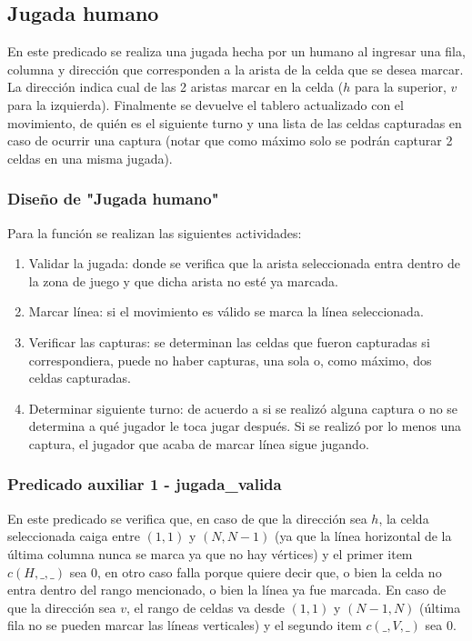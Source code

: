 \documentclass[12pt]{article} %
\begin{document}
		\subsection{Jugada humano}
		En este predicado se realiza una jugada hecha por un humano al ingresar una fila, columna y dirección que corresponden a la arista de la celda que se desea marcar. La dirección indica cual de las 2 aristas marcar en la celda ($h$ para la superior, $v$ para la izquierda). Finalmente se devuelve el tablero actualizado con el movimiento, de quién es el siguiente turno y una lista de las celdas capturadas en caso de ocurrir una captura (notar que como máximo solo se podrán capturar 2 celdas en una misma jugada).
		
			\subsubsection{Diseño de "Jugada humano"}
			Para la función se realizan las siguientes actividades:
			\begin{enumerate}
				\item Validar la jugada: donde se verifica que la arista seleccionada entra dentro de la zona de juego y que dicha arista no esté ya marcada.
				\item Marcar línea: si el movimiento es válido se marca la línea seleccionada.
				\item Verificar las capturas: se determinan las celdas que fueron capturadas si correspondiera, puede no haber capturas, una sola o, como máximo, dos celdas capturadas.
				\item Determinar siguiente turno: de acuerdo a si se realizó alguna captura o no se determina a qué jugador le toca jugar después. Si se realizó por lo menos una captura, el jugador que acaba de marcar línea sigue jugando.
			\end{enumerate}
			
			\subsubsection{Predicado auxiliar 1 - jugada\_valida}
			En este predicado se verifica que, en caso de que la dirección sea $h$, la celda seleccionada caiga entre $(1,1)$ y $(N, N-1)$ (ya que la línea horizontal de la última columna nunca se marca ya que no hay vértices) y el primer item $c(H,\_,\_)$ sea 0, en otro caso falla porque quiere decir que, o bien la celda no entra dentro del rango mencionado, o bien la línea ya fue marcada. En caso de que la dirección sea $v$, el rango de celdas va desde $(1,1)$ y $(N-1,N)$ (última fila no se pueden marcar las líneas verticales) y el segundo item $c(\_,V,\_)$ sea 0.
			
\end{document}
